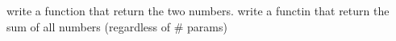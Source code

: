write a function that return the two numbers.
write a functin that return the sum of all numbers (regardless of # params)